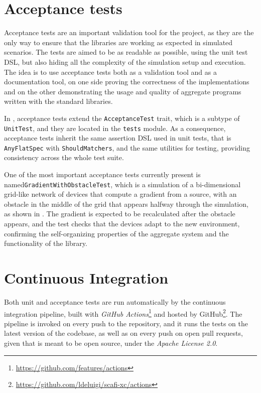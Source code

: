 \section{Acceptance tests}

Acceptance tests are an important validation tool for the project, as they are the only way to ensure that the libraries are working as expected in simulated scenarios.
%
The tests are aimed to be as readable as possible, using the unit test \ac{DSL}, but also hiding all the complexity of the simulation setup and execution.
%
The idea is to use acceptance tests both as a validation tool and as a documentation tool, on one side proving the correctness of the implementations and on the other demonstrating the usage and quality of aggregate programs written with the standard libraries.

In \this, acceptance tests extend the \texttt{AcceptanceTest} trait, which is a subtype of \texttt{UnitTest}, and they are located in the \texttt{tests} module.
%
As a consequence, acceptance tests inherit the same assertion \ac{DSL} used in unit tests, that is \texttt{AnyFlatSpec} with \texttt{ShouldMatchers}, and the same utilities for testing, providing consistency across the whole test suite.

One of the most important acceptance tests currently present is named\linebreak\texttt{GradientWithObstacleTest}, which is a simulation of a bi-dimensional grid-like network of devices that compute a gradient from a source, with an obstacle in the middle of the grid that appears halfway through the simulation, as shown in .
%
The gradient is expected to be recalculated after the obstacle appears, and the test checks that the devices adapt to the new environment, confirming the self-organizing properties of the aggregate system and the functionality of the library.



\section{Continuous Integration} \label{chap:evaluation->sec:continuous-integration}

Both unit and acceptance tests are run automatically by the continuous integration pipeline, built with \textit{GitHub Actions}\footnote{\url{https://github.com/features/actions}} and hosted by GitHub\footnote{\url{https://github.com/ldeluigi/scafi-xc/actions}}.
%
The pipeline is invoked on every push to the repository, and it runs the tests on the latest version of the codebase, as well as on every push on open pull requests, given that \this is meant to be open source, under the \textit{Apache License 2.0}.

